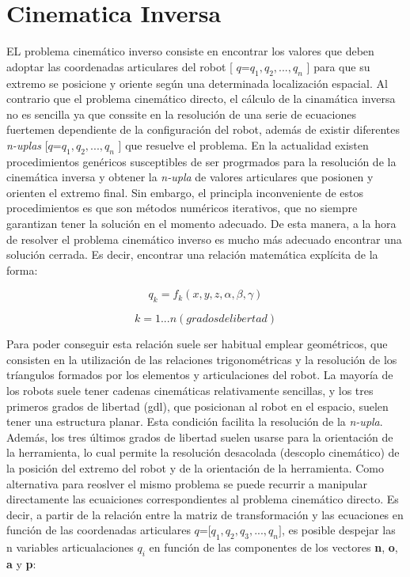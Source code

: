 \documentclass[letter,openright,12pt,spanish]{report}
\begin{document}
\section{Cinematica Inversa}

EL problema cinem\'atico inverso consiste en encontrar los valores que deben adoptar las coordenadas articulares del robot [ $\textit{q=q}_1,\textit{q}_2,...,\textit{q}_n$ ] para que su extremo se posicione y oriente seg\'un una determinada localizaci\'on espacial. Al contrario que el problema cinem\'atico directo, el c\'alculo de la cinam\'atica inversa no es sencilla ya que conssite en la resoluci\'on de una serie de ecuaciones fuertemen dependiente de la configuraci\'on del robot, adem\'as de existir diferentes \textit{n-uplas} [$\textit{q=q}_1,\textit{q}_2,...,\textit{q}_n$ ] que resuelve el problema.
En la actualidad existen procedimientos gen\'ericos susceptibles de ser progrmados para la resoluci\'on de la cinem\'atica inversa y obtener la \textit{n-upla} de valores articulares que posionen y orienten el extremo final. Sin embargo, el principla inconveniente de estos procedimientos es que son m\'etodos num\'ericos iterativos, que no siempre garantizan tener la soluci\'on en el momento adecuado. De esta manera, a la hora de resolver el problema cinem\'atico inverso es mucho m\'as adecuado encontrar una soluci\'on cerrada. Es decir, encontrar una relaci\'on matem\'atica expl\'icita de la forma:

\begin{displaymath}
q_k=f_k(x, y, z, \alpha, \beta, \gamma)
\end{displaymath}

\begin{displaymath}
k=1...n (grados de libertad)
\end{displaymath}

Para poder conseguir esta relaci\'on suele ser habitual emplear geom\'etricos, que consisten en la utilizaci\'on de las relaciones trigonom\'etricas y la resoluci\'on de los tr\'iangulos formados por los elementos y articulaciones del robot. La mayor\'ia de los robots suele tener cadenas cinem\'aticas relativamente sencillas, y los tres primeros grados de libertad (gdl), que posicionan al robot en el espacio, suelen tener una estructura planar. Esta condici\'on facilita la resoluci\'on de la \textit{n-upla}. Adem\'as, los tres \'ultimos grados de libertad suelen usarse para la orientaci\'on de la herramienta, lo cual permite la resoluci\'on desacolada (descoplo cinem\'atico) de la posici\'on del extremo del robot y de la orientaci\'on de la herramienta. Como alternativa para reoslver el mismo problema se puede recurrir a manipular directamente las ecuaiciones correspondientes al problema cinem\'atico directo. Es decir, a partir de la relaci\'on entre la matriz de transformaci\'on y las ecuaciones en funci\'on de las coordenadas articulares $\textit{q=[q}_1,\textit{q}_2,\textit{q}_3,...,\textit{q}_n]$, es posible despejar las n variables articualaciones $q_i$ en funci\'on de las componentes de los vectores \textbf{n}, \textbf{o}, \textbf{a} y \textbf{p}:
\end{document}
